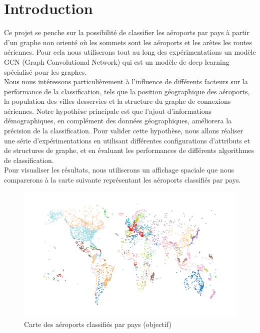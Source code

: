 \section{Introduction}

Ce projet se penche sur la possibilité de classifier les aéroports par pays à partir d'un graphe non orienté où les sommets sont les aéroports et les arêtes les routes aériennes. Pour cela nous utiliserons tout au long des expérimentations un modèle GCN (Graph Convolutional Network) qui est un modèle de deep learning spécialisé pour les graphes.\\
Nous nous intéressons particulièrement à l'influence de différents facteurs sur la performance de la classification, tels que la position géographique des aéroports, la population des villes desservies et la structure du graphe de connexions aériennes. Notre hypothèse principale est que l'ajout d'informations démographiques, en complément des données géographiques, améliorera la précision de la classification.  Pour valider cette hypothèse, nous allons réaliser une série d'expérimentations en utilisant différentes configurations d'attributs et de structures de graphe,  et en évaluant les performances de différents algorithmes de classification.\\

Pour visualiser les résultats, nous utiliserons un affichage spaciale que nous comparerons à la carte suivante représentant les aéroports classifiés par pays.\\

\begin{figure}[h!]
    \centering
    \includegraphics[width=\textwidth]{content/img/map-airports-goal.png}
    \caption{Carte des aéroports classifiés par pays (objectif)}
    \label{fig:map}
\end{figure}
